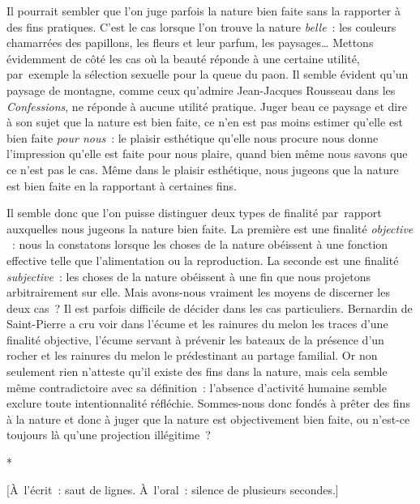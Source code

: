 \documentclass[a4paper,12pt]{article}
\begin{document}
Il pourrait sembler que l'on juge parfois la
nature bien faite sans la rapporter à des fins pratiques. C'est le cas
lorsque l'on trouve la nature \emph{belle}​ : les couleurs
chamarrées des papillons, les fleurs et leur parfum, les paysages\ldots{}
Mettons évidemment de côté les cas où la beauté réponde à une certaine
utilité, par exemple la sélection sexuelle pour la queue du paon. Il
semble évident qu'un paysage de montagne, comme ceux qu'admire
Jean-Jacques Rousseau dans les \emph{Confessions}​, ne réponde à aucune
utilité pratique. Juger beau ce paysage et dire à son sujet que la
nature est bien faite, ce n'en est pas moins estimer qu'elle est bien
faite \emph{pour nous}​ : le plaisir esthétique qu'elle nous procure nous
donne l'impression qu'elle est faite pour nous plaire, quand bien même
nous savons que ce n'est pas le cas. Même dans le plaisir
esthétique, nous jugeons que la nature est bien
faite en la rapportant à certaines fins.

Il semble donc que l'on puisse
distinguer deux types de finalité par rapport auxquelles nous jugeons la
nature bien faite. La première est une finalité \emph{objective}​ : nous la
constatons lorsque les choses de la nature obéissent à une fonction
effective telle que l'alimentation ou la reproduction. La seconde est
une finalité \emph{subjective}​ : les choses de la nature obéissent à une fin
que nous projetons arbitrairement sur elle. Mais
avons-nous vraiment les moyens de discerner les
deux cas ? Il est parfois difficile de décider dans les cas
particuliers. Bernardin de Saint-Pierre a cru voir dans l'écume et les
rainures du melon les traces d'une finalité objective, l'écume servant à
prévenir les bateaux de la présence d'un rocher et les rainures du melon
le prédestinant au partage familial. Or non seulement rien n'atteste
qu'il existe des fins dans la nature, mais cela semble même
contradictoire avec sa définition : l'absence d'activité humaine semble
exclure toute intentionnalité réfléchie. Sommes-nous donc fondés à
prêter des fins à la nature et donc à juger que la nature est
objectivement bien faite, ou n'est-ce toujours là qu'une projection
illégitime ?

\begin{center}
*

[À l'écrit : saut de lignes. À l'oral : silence de plusieurs secondes.]
\end{center}
\end{document}
